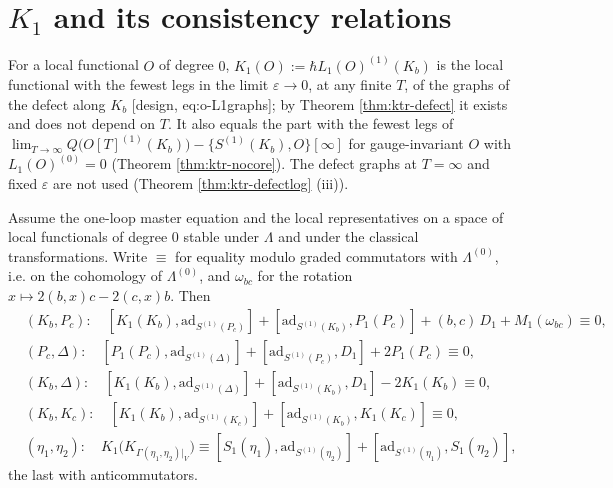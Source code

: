 \section{$K_1$ and its consistency relations}

\begin{definition}
\label{def:ktr-K1}
For a local functional $O$ of degree $0$, $K_1(O):=\hbar L_1(O)^{(1)}(K_b)$ is the local functional with the fewest legs in the limit $\varepsilon\to0$, at any finite $T$, of the graphs of the defect along $K_b$ [design, eq:o-L1graphs]; by Theorem \ref{thm:ktr-defect} it exists and does not depend on $T$. It also equals the part with the fewest legs of $\lim_{T\to\infty}Q\big(O[T]^{(1)}(K_b)\big)-\{S^{(1)}(K_b),O\}[\infty]$ for gauge-invariant $O$ with $L_1(O)^{(0)}=0$ (Theorem \ref{thm:ktr-nocore}). The defect graphs at $T=\infty$ and fixed $\varepsilon$ are not used (Theorem \ref{thm:ktr-defectlog} (iii)).
\end{definition}

\begin{theorem}
\label{thm:ktr-relations}
Assume the one-loop master equation and the local representatives on a space of local functionals of degree $0$ stable under $\Lambda$ and under the classical transformations. Write $\equiv$ for equality modulo graded commutators with $\Lambda^{(0)}$, i.e. on the cohomology of $\Lambda^{(0)}$, and $\omega_{bc}$ for the rotation $x\mapsto2(b,x)c-2(c,x)b$. Then
\begin{equation}
\begin{aligned}
&(K_b,P_c):\quad [K_1(K_b),\mathrm{ad}_{S^{(1)}(P_c)}]+[\mathrm{ad}_{S^{(1)}(K_b)},P_1(P_c)]+(b,c)\,D_1+M_1(\omega_{bc})\equiv0,\\
&(P_c,\Delta):\quad [P_1(P_c),\mathrm{ad}_{S^{(1)}(\Delta)}]+[\mathrm{ad}_{S^{(1)}(P_c)},D_1]+2P_1(P_c)\equiv0,\\
&(K_b,\Delta):\quad [K_1(K_b),\mathrm{ad}_{S^{(1)}(\Delta)}]+[\mathrm{ad}_{S^{(1)}(K_b)},D_1]-2K_1(K_b)\equiv0,\\
&(K_b,K_c):\quad [K_1(K_b),\mathrm{ad}_{S^{(1)}(K_c)}]+[\mathrm{ad}_{S^{(1)}(K_b)},K_1(K_c)]\equiv0,\\
&(\eta_1,\eta_2):\quad K_1\big(K_{\Gamma(\eta_1,\eta_2)|_V}\big)\equiv[S_1(\eta_1),\mathrm{ad}_{S^{(1)}(\eta_2)}]+[\mathrm{ad}_{S^{(1)}(\eta_1)},S_1(\eta_2)],
\end{aligned}
\label{eq:ktr-relations}
\end{equation}
the last with anticommutators.
\end{theorem}

